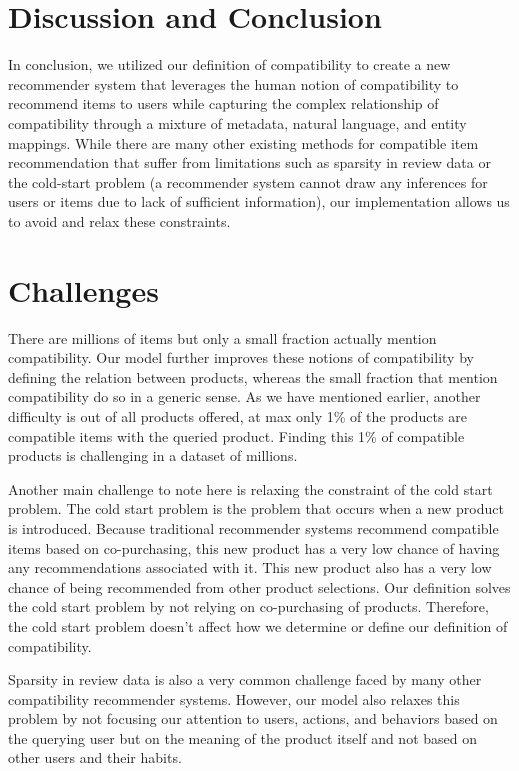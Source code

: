 \section{Discussion and Conclusion}
In conclusion, we utilized our definition of compatibility to create a new recommender system that leverages the human notion of compatibility to recommend items to users while capturing the complex relationship of compatibility through a mixture of metadata, natural language, and entity mappings. While there are many other existing methods for compatible item recommendation that suffer from limitations such as sparsity in review data or the cold-start problem (a recommender system cannot draw any inferences for users or items due to lack of sufficient information), our implementation allows us to avoid and relax these constraints. 

\section{Challenges}
There are millions of items but only a small fraction actually mention compatibility. Our model further improves these notions of compatibility by defining the relation between products, whereas the small fraction that mention compatibility do so in a generic sense. As we have mentioned earlier, another difficulty is out of all products offered, at max only 1\% of the products are compatible items with the queried product. Finding this 1\% of compatible products is challenging in a dataset of millions.

Another main challenge to note here is relaxing the constraint of the cold start problem. The cold start problem is the problem that occurs when a new product is introduced. Because traditional recommender systems recommend compatible items based on co-purchasing, this new product has a very low chance of having any recommendations associated with it. This new product also has a very low chance of being recommended from other product selections. Our definition solves the cold start problem by not relying on co-purchasing of products. Therefore, the cold start problem doesn't affect how we determine or define our definition of compatibility.

Sparsity in review data is also a very common challenge faced by many other compatibility recommender systems. However, our model also relaxes this problem by not focusing our attention to users, actions, and behaviors based on the querying user but on the meaning of the product itself and not based on other users and their habits. 

